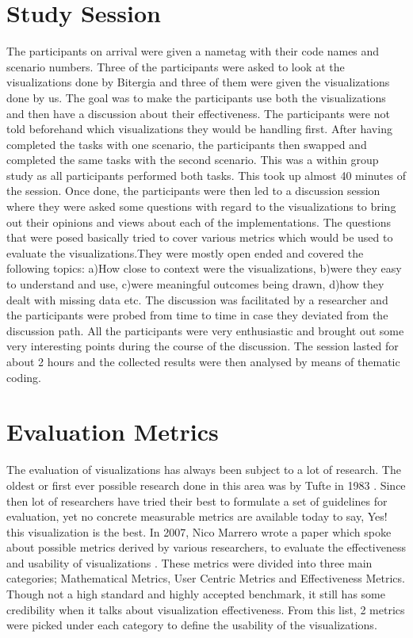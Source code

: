 \documentclass[seploa]{beavtex}
\begin{document}
\section{Study Session}
The participants on arrival were given a nametag with their code names and scenario numbers. Three of the participants were asked to look at the visualizations done by Bitergia and three of them were given the visualizations done by us. The goal was to make the participants use both the visualizations and then have a discussion about their effectiveness. The participants were not told beforehand which visualizations they would be handling first. After having completed the tasks with one scenario, the participants then swapped and completed the same tasks with the second scenario. This was a within group study as all participants performed both tasks. This took up almost 40 minutes of the session. Once done, the participants were then led to a discussion session where they were asked some questions with regard to the visualizations to bring out their opinions and views about each of the implementations. The questions that were posed basically tried to cover various metrics which would be used to evaluate the visualizations.They were mostly open ended and covered the following topics: a)How close to context were the visualizations, b)were they easy to understand and use, c)were meaningful outcomes being drawn, d)how they dealt with missing data etc. The discussion was facilitated by a researcher and the participants were probed from time to time in case they deviated from the discussion path. All the participants were very enthusiastic and brought out some very interesting points during the course of the discussion. The session lasted for about 2 hours and the collected results were then analysed by means of thematic coding.

\section{Evaluation Metrics}
The evaluation of visualizations has always been subject to a lot of research. The oldest or first ever possible research done in this area was by Tufte in 1983 \cite{tufte1983}. Since then lot of researchers have tried their best to formulate a set of guidelines for evaluation, yet no concrete measurable metrics are available today to say, Yes! this visualization is the best. In 2007, Nico Marrero wrote a paper which spoke about possible metrics derived by various researchers, to evaluate the effectiveness and usability of visualizations \cite{nico2007}. These metrics were divided into three main categories; Mathematical Metrics, User Centric Metrics and Effectiveness Metrics. Though not a high standard and highly accepted benchmark, it still has some credibility when it talks about visualization effectiveness. From this list, 2 metrics were picked under each category to define the usability of the visualizations.
\end{document}
